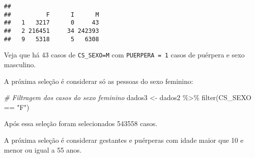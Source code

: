 \documentclass[
]{article}
\newenvironment{Shaded}{\begin{snugshade}}{\end{snugshade}}
\newcommand{\AttributeTok}[1]{\textcolor[rgb]{0.77,0.63,0.00}{#1}}
\newcommand{\CommentTok}[1]{\textcolor[rgb]{0.56,0.35,0.01}{\textit{#1}}}
\newcommand{\DecValTok}[1]{\textcolor[rgb]{0.00,0.00,0.81}{#1}}
\newcommand{\FunctionTok}[1]{\textcolor[rgb]{0.00,0.00,0.00}{#1}}
\newcommand{\NormalTok}[1]{#1}
\newcommand{\OtherTok}[1]{\textcolor[rgb]{0.56,0.35,0.01}{#1}}
\newcommand{\SpecialCharTok}[1]{\textcolor[rgb]{0.00,0.00,0.00}{#1}}
\newcommand{\StringTok}[1]{\textcolor[rgb]{0.31,0.60,0.02}{#1}}
\begin{document}
\begin{Shaded}
\end{Shaded}

\begin{verbatim}
##    
##          F      I      M
##   1   3217      0     43
##   2 216451     34 242393
##   9   5318      5   6308
\end{verbatim}

Veja que há 43 casos de \texttt{CS\_SEXO=M} com \texttt{PUERPERA\ =\ 1}
casos de puérpera e sexo masculino.

A próxima seleção é considerar só as pessoas do sexo feminino:

\begin{Shaded}
\begin{Highlighting}[]
\CommentTok{\# Filtragem dos casos do sexo feminino}
\NormalTok{dados3 }\OtherTok{\textless{}{-}}\NormalTok{ dados2 }\SpecialCharTok{\%\textgreater{}\%} 
  \FunctionTok{filter}\NormalTok{(CS\_SEXO }\SpecialCharTok{==} \StringTok{"F"}\NormalTok{)}
\end{Highlighting}
\end{Shaded}

Após essa seleção foram selecionados 543558 casos.

A próxima seleção é considerar gestantes e puérperas com idade maior que
10 e menor ou igual a 55 anos.

\begin{Shaded}
\end{Shaded}
\end{document}
